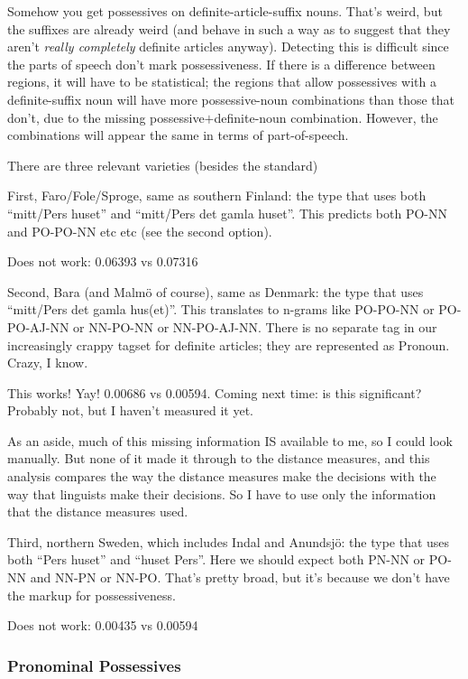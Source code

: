 Somehow you get possessives on definite-article-suffix nouns. That's
weird, but the suffixes are already weird (and behave in such a way as
to suggest that they aren't {\it really completely} definite articles
anyway). Detecting this is difficult since the parts of speech don't
mark possessiveness. If there is a difference between regions, it will
have to be statistical; the regions that allow possessives with a
definite-suffix noun will have more possessive-noun combinations than
those that don't, due to the missing possessive$+$definite-noun
combination. However, the combinations will appear the same in terms
of part-of-speech.

There are three relevant varieties (besides the standard)

First, Faro/Fole/Sproge, same as southern Finland: the type that uses
both ``mitt/Pers huset'' and ``mitt/Pers det gamla huset''. This
predicts both PO-NN and PO-PO-NN etc etc (see the second option).

Does not work: 0.06393 vs 0.07316

Second, Bara (and Malm\"o of course), same as Denmark: the type that
uses ``mitt/Pers det gamla hus(et)''. This translates to n-grams like
PO-PO-NN or PO-PO-AJ-NN or NN-PO-NN or NN-PO-AJ-NN. There is no
separate tag in our increasingly crappy tagset for definite articles;
they are represented as Pronoun. Crazy, I know.

This works! Yay! 0.00686 vs 0.00594. Coming next time: is this
significant? Probably not, but I haven't measured it yet.

As an aside, much of this missing information IS available to me, so I
could look manually. But none of it made it through to the distance
measures, and this analysis compares the way the distance measures
make the decisions with the way that linguists make their
decisions. So I have to use only the information that the distance
measures used.

Third, northern Sweden, which includes Indal and Anundsj\"o: the type
that uses both ``Pers huset'' and ``huset Pers''. Here we should
expect both PN-NN or PO-NN and NN-PN or NN-PO. That's pretty broad,
but it's because we don't have the markup for possessiveness.

Does not work: 0.00435 vs 0.00594

\subsubsection{Pronominal Possessives}

